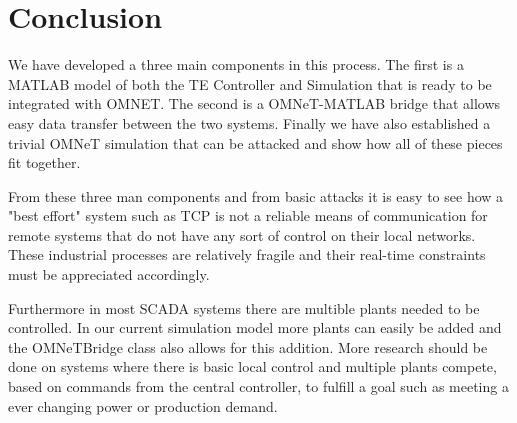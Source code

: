 \section{Conclusion}
We have developed a three main components in this process. The first is a MATLAB model of both the TE Controller and Simulation that is ready to be integrated with OMNET. The second is a OMNeT-MATLAB bridge that allows easy data transfer between the two systems. Finally we have also established a trivial OMNeT simulation that can be attacked and show how all of these pieces fit together. 

From these three man components and from basic attacks it is easy to see how a "best effort" system such as TCP is not a reliable means of communication for remote systems that do not have any sort of control on their local networks. These industrial processes are relatively fragile and their real-time constraints must be appreciated accordingly. 

Furthermore in most SCADA systems there are multible plants needed to be controlled. In our current simulation model more plants can easily be added and the OMNeTBridge class also allows for this addition. More research should be done on systems where there is basic local control and multiple plants compete, based on commands from the central controller, to fulfill a goal such as meeting a ever changing power or production demand.  